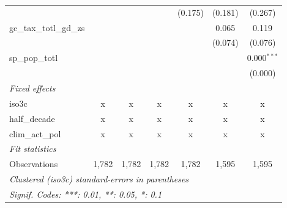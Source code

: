 \begin{tabular}{lcccccc}
                                                             &          &         &         & (0.175)       & (0.181)        & (0.267)\\   
   gc\_tax\_totl\_gd\_zs                                     &          &         &         &               & 0.065          & 0.119\\   
                                                             &          &         &         &               & (0.074)        & (0.076)\\   
   sp\_pop\_totl                                             &          &         &         &               &                & 0.000$^{***}$\\   
                                                             &          &         &         &               &                & (0.000)\\   
   \emph{Fixed effects}\\
   iso3c                                                     & x        & x       & x       & x             & x              & x\\  
   half\_decade                                              & x        & x       & x       & x             & x              & x\\  
   clim\_act\_pol                                            & x        & x       & x       & x             & x              & x\\  
   \midrule \emph{Fit statistics}\\
   Observations                                              & 1,782    & 1,782   & 1,782   & 1,782         & 1,595          & 1,595\\  
   \midrule
   \multicolumn{7}{l}{\emph{Clustered (iso3c) standard-errors in parentheses}}\\
   \multicolumn{7}{l}{\emph{Signif. Codes: ***: 0.01, **: 0.05, *: 0.1}}\\
\end{tabular}
\par\endgroup



